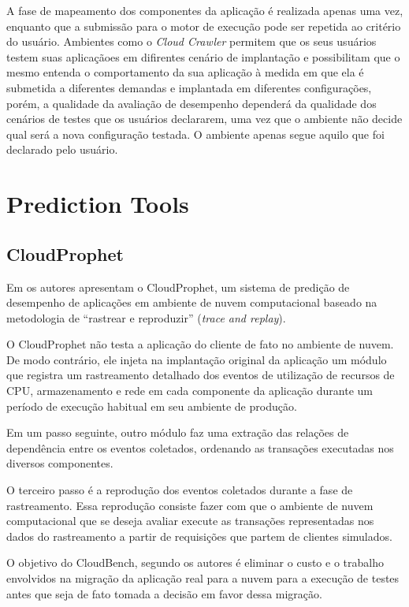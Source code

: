 A fase de mapeamento dos componentes da aplicação é realizada apenas uma vez, enquanto que a submissão para o motor de execução pode ser repetida ao critério do usuário. Ambientes como o {\em Cloud Crawler} permitem que os seus usuários testem suas aplicaçãoes em difirentes cenário de implantação e possibilitam que o mesmo entenda o comportamento da sua aplicação à medida em que ela é submetida a diferentes demandas e implantada em diferentes configurações, porém, a qualidade da avaliação de desempenho dependerá da qualidade dos cenários de testes que os usuários declararem, uma vez que o ambiente não decide qual será a nova configuração testada. O ambiente apenas segue aquilo que foi declarado pelo usuário.   

\section{Prediction Tools}
\subsection{CloudProphet}
Em \cite{li2011cloudprophet} os autores apresentam o CloudProphet, um sistema de
predição de desempenho de aplicações em ambiente de nuvem computacional baseado 
na metodologia de ``rastrear e reproduzir'' (\textit{trace and replay}).

O CloudProphet não testa a aplicação do cliente de fato no ambiente de nuvem. De
modo contrário, ele injeta na implantação original da aplicação um módulo que 
registra um rastreamento detalhado dos eventos de utilização de recursos de CPU,
armazenamento e rede em cada componente da aplicação durante um período de 
execução habitual em seu ambiente de produção.

Em um passo seguinte, outro módulo faz uma extração das relações de dependência 
entre os eventos coletados, ordenando as transações executadas nos diversos 
componentes.

O terceiro passo é a reprodução dos eventos coletados durante a fase de 
rastreamento. Essa reprodução consiste fazer com que o ambiente de nuvem 
computacional que se deseja avaliar execute as transações representadas nos dados
do rastreamento a partir de requisições que partem de clientes simulados.
   
O objetivo do CloudBench, segundo os autores é eliminar o custo e o trabalho 
envolvidos na migração da aplicação real para a nuvem para a execução de testes 
antes que seja de fato tomada a decisão em favor dessa migração.

